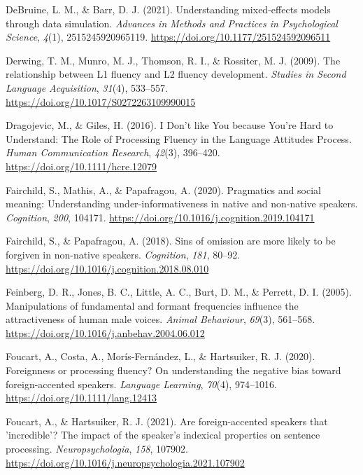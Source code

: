 \documentclass[
  man,floatsintext]{apa7}
\newlength{\cslhangindent}
\newlength{\cslentryspacingunit} %
\newenvironment{CSLReferences}[2] %
 {%
  \setlength{\parindent}{0pt}
  \ifodd #1
  \let\oldpar\par
  \def\par{\hangindent=\cslhangindent\oldpar}
  \fi
  \setlength{\parskip}{#2\cslentryspacingunit}
 }%
 {}
\begin{document}
\begin{CSLReferences}{1}{0}
\leavevmode{}%
DeBruine, L. M., \& Barr, D. J. (2021). Understanding mixed-effects models through data simulation. \emph{Advances in Methods and Practices in Psychological Science}, \emph{4}(1), 2515245920965119. \url{https://doi.org/10.1177/251524592096511}

\leavevmode{}%
Derwing, T. M., Munro, M. J., Thomson, R. I., \& Rossiter, M. J. (2009). The relationship between L1 fluency and L2 fluency development. \emph{Studies in Second Language Acquisition}, \emph{31}(4), 533--557. \url{https://doi.org/10.1017/S0272263109990015}

\leavevmode{}%
Dragojevic, M., \& Giles, H. (2016). I {D}on't like {Y}ou because {Y}ou're {H}ard to {U}nderstand: {T}he {R}ole of {P}rocessing {F}luency in the {L}anguage {A}ttitudes {P}rocess. \emph{Human Communication Research}, \emph{42}(3), 396--420. \url{https://doi.org/10.1111/hcre.12079}

\leavevmode{}%
Fairchild, S., Mathis, A., \& Papafragou, A. (2020). Pragmatics and social meaning: Understanding under-informativeness in native and non-native speakers. \emph{Cognition}, \emph{200}, 104171. \url{https://doi.org/10.1016/j.cognition.2019.104171}

\leavevmode{}%
Fairchild, S., \& Papafragou, A. (2018). Sins of omission are more likely to be forgiven in non-native speakers. \emph{Cognition}, \emph{181}, 80--92. \url{https://doi.org/10.1016/j.cognition.2018.08.010}

\leavevmode{}%
Feinberg, D. R., Jones, B. C., Little, A. C., Burt, D. M., \& Perrett, D. I. (2005). Manipulations of fundamental and formant frequencies influence the attractiveness of human male voices. \emph{Animal Behaviour}, \emph{69}(3), 561--568. \url{https://doi.org/10.1016/j.anbehav.2004.06.012}

\leavevmode{}%
Foucart, A., Costa, A., Morís-Fernández, L., \& Hartsuiker, R. J. (2020). Foreignness or processing {fluency? On} understanding the negative bias toward foreign-accented speakers. \emph{Language Learning}, \emph{70}(4), 974--1016. \url{https://doi.org/10.1111/lang.12413}

\leavevmode{}%
Foucart, A., \& Hartsuiker, R. J. (2021). Are foreign-accented speakers that 'incredible'? The impact of the speaker's indexical properties on sentence processing. \emph{Neuropsychologia}, \emph{158}, 107902. \url{https://doi.org/10.1016/j.neuropsychologia.2021.107902}


\end{CSLReferences}
\end{document}
